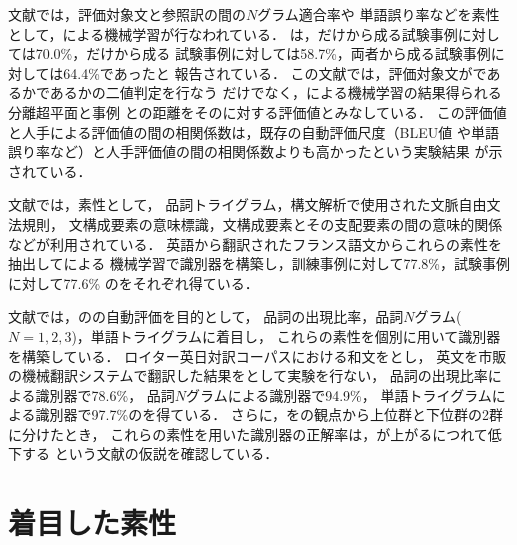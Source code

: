\documentclass[japanese]{jnlp_1.4}
\newcommand{\FLU}{}
\newcommand{\HUM}{}
\newcommand{\MT}{}
\newcommand{\SVM}{}
\newcommand{\ACC}{}
\begin{document}
文献\cite{Kulesza04}では，評価対象文と参照訳の間の$N$グラム適合率や
単語誤り率などを素性として，{\SVM}による機械学習が行なわれている．
{\ACC}は，{\MT}だけから成る試験事例に対しては70.0\%，{\HUM}だけから成る
試験事例に対しては58.7\%，両者から成る試験事例に対しては64.4\%であったと
報告されている．
この文献では，評価対象文が{\MT}であるか{\HUM}であるかの二値判定を行なう
だけでなく，{\SVM}による機械学習の結果得られる分離超平面と事例
との距離をその{\MT}に対する評価値とみなしている．
この評価値と人手による評価値の間の相関係数は，既存の自動評価尺度（BLEU値
や単語誤り率など）と人手評価値の間の相関係数よりも高かったという実験結果
が示されている．





文献\cite{Gamon05}では，素性として，
品詞トライグラム，構文解析で使用された文脈自由文法規則，
文構成要素の意味標識，文構成要素とその支配要素の間の意味的関係
などが利用されている．
英語から翻訳されたフランス語文からこれらの素性を抽出して{\SVM}による
機械学習で識別器を構築し，訓練事例に対して77.8\%，試験事例に対して77.6\%
の{\ACC}をそれぞれ得ている．

文献\cite{Tanaka08}では，{\MT}の{\FLU}の自動評価を目的として，
品詞の出現比率，品詞$N$グラム($N=1,2,3$)，単語トライグラムに着目し，
これらの素性を個別に用いて識別器を構築している．
ロイター英日対訳コーパス\cite{Uchiyama03}における和文を{\HUM}とし，
英文を市販の機械翻訳システムで翻訳した結果を{\MT}として実験を行ない，
品詞の出現比率による識別器で78.6\%，
品詞$N$グラムによる識別器で94.9\%，
単語トライグラムによる識別器で97.7\%の{\ACC}を得ている．
さらに，{\MT}を{\FLU}の観点から上位群と下位群の2群に分けたとき，
これらの素性を用いた識別器の正解率は，{\FLU}が上がるにつれて低下する
という文献\cite{Oliver01}の仮説を確認している．



\section{着目した素性}
\label{sec:feats}
\end{document}
